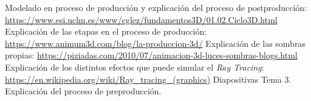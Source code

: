 \documentclass{article}
\begin{document}
\begin{thebibliography}{1}
     Modelado en proceso de producción y explicación del proceso de postproducción: \url{https://www.esi.uclm.es/www/cglez/fundamentos3D/01.02.Ciclo3D.html}
     Explicación de las etapas en el proceso de producción: \url{https://www.animum3d.com/blog/la-produccion-3d/}
     Explicación de las sombras propias: \url{https://piziadas.com/2010/07/animacion-3d-luces-sombras-blogs.html}
     Explicación de los distintos efectos que puede simular el \textit{Ray Tracing}: \url{https://en.wikipedia.org/wiki/Ray_tracing_(graphics)}
     Diapositivas Tema 3. Explicación del proceso de preproducción.
\end{thebibliography}
\end{document}
